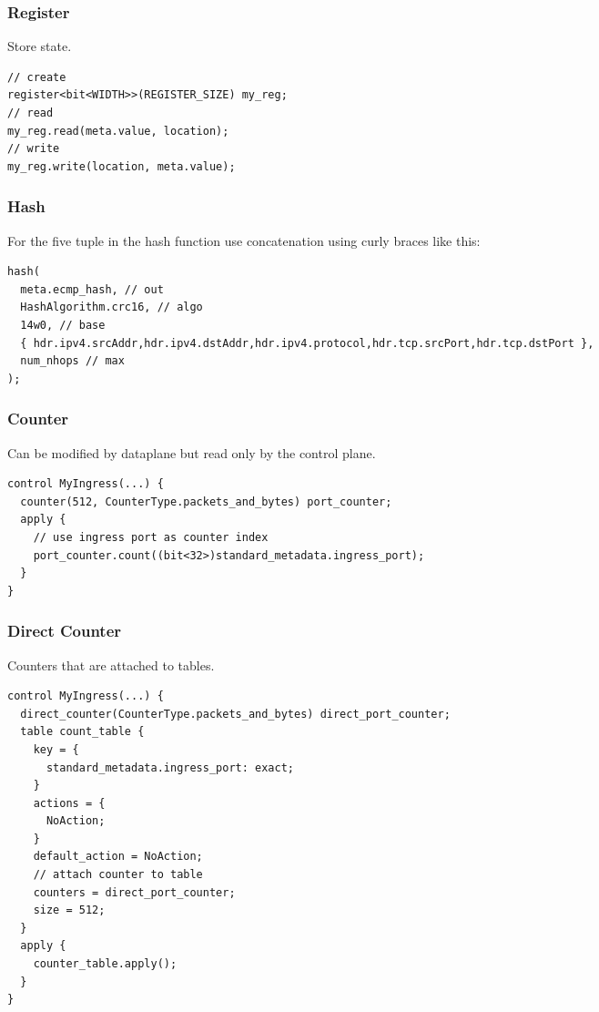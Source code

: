 \documentclass[a4paper, fontsize=8pt, landscape, DIV=1]{scrartcl}
\begin{document}
\begin{multicols*}{3}
  \subsubsection{Register}
  Store state.
  \begin{lstlisting}[style=P4style]
// create
register<bit<WIDTH>>(REGISTER_SIZE) my_reg;
// read
my_reg.read(meta.value, location);
// write
my_reg.write(location, meta.value);\end{lstlisting}

  \subsubsection{Hash}
  For the five tuple in the hash function use concatenation using curly braces like this:
  \begin{lstlisting}[style=P4style]
hash(
  meta.ecmp_hash, // out
  HashAlgorithm.crc16, // algo
  14w0, // base
  { hdr.ipv4.srcAddr,hdr.ipv4.dstAddr,hdr.ipv4.protocol,hdr.tcp.srcPort,hdr.tcp.dstPort },
  num_nhops // max
);\end{lstlisting}

  \subsubsection{Counter}
  Can be modified by dataplane but read only by the control plane.
  \begin{lstlisting}[style=P4style]
control MyIngress(...) {
  counter(512, CounterType.packets_and_bytes) port_counter;
  apply {
    // use ingress port as counter index
    port_counter.count((bit<32>)standard_metadata.ingress_port);
  }
}\end{lstlisting}

  \subsubsection{Direct Counter}
  Counters that are attached to tables.
  \begin{lstlisting}[style=P4style]
control MyIngress(...) {
  direct_counter(CounterType.packets_and_bytes) direct_port_counter;
  table count_table {
    key = {
      standard_metadata.ingress_port: exact;
    }
    actions = {
      NoAction;
    }
    default_action = NoAction;
    // attach counter to table
    counters = direct_port_counter;
    size = 512;
  }
  apply {
    counter_table.apply();
  }
}\end{lstlisting}



\end{multicols*}
\end{document}
